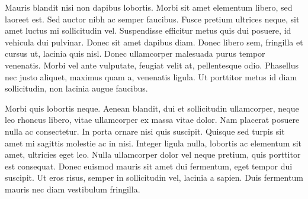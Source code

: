 \documentclass[\pandocDocMode,longtable, floatsintext, noextraspace]{apa6}
\begin{document}
Mauris blandit nisi non dapibus lobortis. Morbi sit amet elementum
libero, sed laoreet est. Sed auctor nibh ac semper faucibus. Fusce
pretium ultrices neque, sit amet luctus mi sollicitudin vel. Suspendisse
efficitur metus quis dui posuere, id vehicula dui pulvinar. Donec sit
amet dapibus diam. Donec libero sem, fringilla et cursus ut, lacinia
quis nisl. Donec ullamcorper malesuada purus tempor venenatis. Morbi vel
ante vulputate, feugiat velit at, pellentesque odio. Phasellus nec justo
aliquet, maximus quam a, venenatis ligula. Ut porttitor metus id diam
sollicitudin, non lacinia augue faucibus.

Morbi quis lobortis neque. Aenean blandit, dui et sollicitudin
ullamcorper, neque leo rhoncus libero, vitae ullamcorper ex massa vitae
dolor. Nam placerat posuere nulla ac consectetur. In porta ornare nisi
quis suscipit. Quisque sed turpis sit amet mi sagittis molestie ac in
nisi. Integer ligula nulla, lobortis ac elementum sit amet, ultricies
eget leo. Nulla ullamcorper dolor vel neque pretium, quis porttitor est
consequat. Donec euismod mauris sit amet dui fermentum, eget tempor dui
suscipit. Ut eros risus, semper in sollicitudin vel, lacinia a sapien.
Duis fermentum mauris nec diam vestibulum fringilla.
\end{document}
